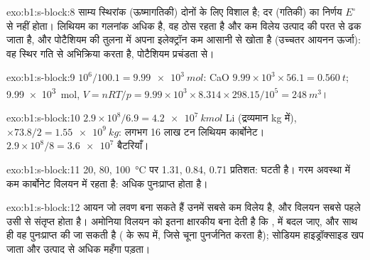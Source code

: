 \begin{solution}{exo:b1:s-block:8}
साम्य स्थिरांक (ऊष्मागतिकी) दोनों के लिए विशाल है; दर
(गतिकी) का निर्णय $E^\circ$ से नहीं होता। लिथियम का गलनांक
अधिक है, वह ठोस रहता है और कम विलेय उत्पाद की परत से ढक जाता है,
और पोटैशियम की तुलना में अपना इलेक्ट्रॉन कम आसानी से खोता है (उच्चतर आयनन
ऊर्जा): वह स्थिर गति से अभिक्रिया करता है, पोटैशियम प्रचंडता से।
\end{solution}

\begin{solution}{exo:b1:s-block:9}
$10^6/100.1 = \qty{9.99e3}{mol}$: CaO $9.99 \times 10^3 \times 56.1 =
\qty{0.560}{t}$;  \qty{9.99e3}{mol}, $V = nRT/p = 9.99 \times 10^3
\times 8.314 \times 298.15/10^5 = \qty{248}{m^3}$।
\end{solution}

\begin{solution}{exo:b1:s-block:10}
$2.9 \times 10^8/6.9 = \qty{4.2e7}{kmol}$ Li (द्रव्यमान kg में), $\times 73.8/2 =
\qty{1.55e9}{kg}$: लगभग 16 लाख टन लिथियम कार्बोनेट।
$2.9 \times 10^8/8 = \num{3.6e7}$ बैटरियाँ।
\end{solution}

\begin{solution}{exo:b1:s-block:11}
20, 80, \qty{100}{\celsius} पर 1.31, 0.84, 0.71 प्रतिशत: 
घटती है। गरम अवस्था में कम कार्बोनेट विलयन में रहता है: अधिक पुनःप्राप्त होता है।
\end{solution}

\begin{solution}{exo:b1:s-block:12}
आयन जो लवण बना सकते हैं उनमें  सबसे कम विलेय है, और
विलयन सबसे पहले उसी से संतृप्त होता है। अमोनिया विलयन को इतना क्षारकीय बना देती है
कि ,  में बदल जाए, और साथ ही वह पुनःप्राप्त की जा सकती है
( के रूप में, जिसे चूना पुनर्जनित करता है); सोडियम हाइड्रॉक्साइड खप जाता और
उत्पाद से अधिक महँगा पड़ता।
\end{solution}

